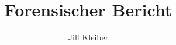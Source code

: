 \usepackage[utf8]{inputenc}
\usepackage[ngerman]{babel}
\usepackage[ngerman]{isodate}
\usepackage{etex}
\usepackage[T1]{fontenc}
\usepackage{lmodern}
\usepackage[german]{fancyref}
\usepackage{nameref}
\usepackage{graphicx}
\usepackage{tikz}
\usetikzlibrary{trees}
\usepackage[pict2e]{struktex}
\usepackage{pgfplots}
\usepackage{pdfpages}
\usepackage{filecontents}
\usepackage{subcaption}
\usepackage{listings, lstautogobble}
\usepackage{float}
\usepackage{fancyhdr}

\lstset{
	numbers=none, 
	frame=single, 
	keepspaces=false, 
	basicstyle=\footnotesize, 
	gobble=4,
	columns=fullflexible
}

\author{Jill Kleiber}
\title{Forensischer Bericht}